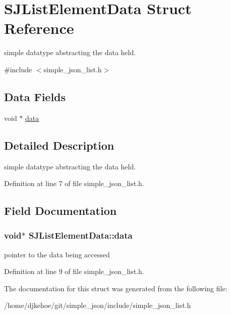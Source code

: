 \hypertarget{structSJListElementData}{}\section{S\+J\+List\+Element\+Data Struct Reference}
\label{structSJListElementData}


simple datatype abstracting the data held.  




{\ttfamily \#include $<$simple\+\_\+json\+\_\+list.\+h$>$}

\subsection*{Data Fields}
\begin{DoxyCompactItemize}
\item 
void $\ast$ \hyperlink{structSJListElementData_ae48c7175a4477eb042b02b70c88485d1}{data}
\end{DoxyCompactItemize}


\subsection{Detailed Description}
simple datatype abstracting the data held. 

Definition at line 7 of file simple\+\_\+json\+\_\+list.\+h.



\subsection{Field Documentation}
\subsubsection[{\texorpdfstring{data}{data}}]{\setlength{\rightskip}{0pt plus 5cm}void$\ast$ S\+J\+List\+Element\+Data\+::data}\hypertarget{structSJListElementData_ae48c7175a4477eb042b02b70c88485d1}{}\label{structSJListElementData_ae48c7175a4477eb042b02b70c88485d1}
pointer to the data being accessed 

Definition at line 9 of file simple\+\_\+json\+\_\+list.\+h.



The documentation for this struct was generated from the following file\+:\begin{DoxyCompactItemize}
\item 
/home/djkehoe/git/simple\+\_\+json/include/simple\+\_\+json\+\_\+list.\+h\end{DoxyCompactItemize}
